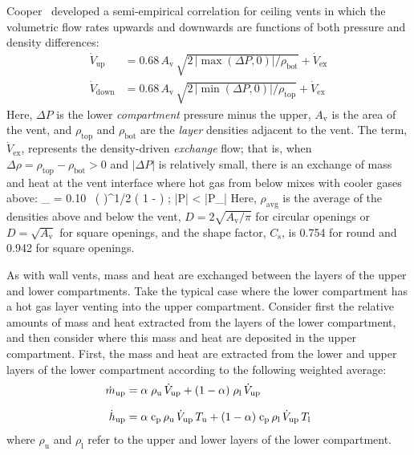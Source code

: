 \documentclass[12pt,twoside]{book}
\begin{document}
Cooper~\cite{Cooper:1989} developed a semi-empirical correlation for ceiling vents in which the volumetric flow rates upwards and downwards are functions of both pressure and density differences:
\begin{align}
   \dot{V}_{\mathrm{up}}   &=  0.68 \, A_{\mathrm{v}} \, \sqrt{ 2 \, |\max(\Delta P,0)|/\rho_{\mathrm{bot}} } + \dot{V}_{\mathrm{ex}}  \\[.1in]
   \dot{V}_{\mathrm{down}} &=  0.68 \, A_{\mathrm{v}} \, \sqrt{ 2 \, |\min(\Delta P,0)|/\rho_{\mathrm{top}} } + \dot{V}_{\mathrm{ex}}
\end{align}
Here, $\Delta P$ is the  lower \emph{compartment} pressure minus the upper, $A_{\mathrm{v}}$ is the area of the vent, and $\rho_{\mathrm{top}}$ and $\rho_{\mathrm{bot}}$ are the \emph{layer} densities adjacent to the vent. The term, $\dot{V}_{\mathrm{ex}}$, represents the density-driven \emph{exchange} flow; that is, when $\Delta \rho=\rho_{\mathrm{top}}-\rho_{\mathrm{bot}}>0$ and $|\Delta P|$ is relatively small, there is an exchange of mass and heat at the vent interface where hot gas from below mixes with cooler gases above:
\be
   _{} = 0.10 \, \left(  \right)^{1/2} \left( 1 -  \right) \quad ; \quad
   |\Delta P| < |\Delta P_{}| \equiv {}
\ee
Here, $\rho_{\mathrm{avg}}$ is the average of the densities above and below the vent, $D = 2 \sqrt{A_{\mathrm{v}} / \pi}$ for circular openings or $D = \sqrt{A_{\mathrm{v}}}$ for square openings, and the shape factor, $C_{\mathrm{s}}$, is 0.754 for round and 0.942 for square openings.

As with wall vents, mass and heat are exchanged between the layers of the upper and lower compartments. Take the typical case where the lower compartment has a hot gas layer venting into the upper compartment. Consider first the relative amounts of mass and heat extracted from the layers of the lower compartment, and then consider where this mass and heat are deposited in the upper compartment. First, the mass and heat are extracted from the lower and upper layers of the lower compartment according to the following weighted average:
\begin{align}
  \dot{m}_{\mathrm{up}}  &= \alpha \; \rho_{\mathrm{u}} \, \dot{V}_{\mathrm{up}} + (1-\alpha) \; \rho_{\mathrm{l}} \, \dot{V}_{\mathrm{up}}  \\[.1in]
  \dot{h}_{\mathrm{up}} &= \alpha \; {\mathrm{c}}\sb{\mathrm{p}} \, \rho_{\mathrm{u}} \, \dot{V}_{\mathrm{up}} \, T\sb{\mathrm{u}} + (1-\alpha) \; {\mathrm{c}}\sb{\mathrm{p}} \, \rho_{\mathrm{l}} \, \dot{V}_{\mathrm{up}} \, T\sb{\mathrm{l}}
\end{align}
where $\rho_{\mathrm{u}}$ and $\rho_{\mathrm{l}}$ refer to the upper and lower layers of the lower compartment.
\end{document}
